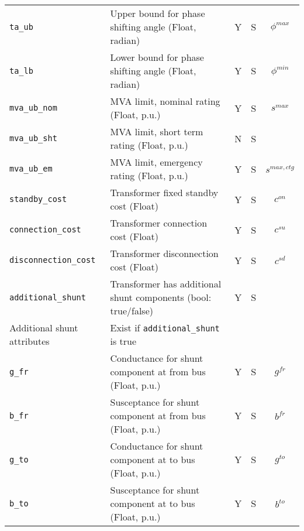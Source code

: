 \documentclass{article}
\begin{document}
\begin{center}
\begin{tabular}{ l | l | c | c | c |}
  {\tt ta\_ub} & Upper bound for phase shifting angle (Float, radian)& Y & S & $\phi^{max}$\\
  {\tt ta\_lb} & Lower bound for phase shifting angle (Float, radian)& Y & S & $\phi^{min}$\\
  {\tt mva\_ub\_nom} & MVA limit, nominal rating (Float, p.u.) & Y & S & $s^{max}$ \\
  {\tt mva\_ub\_sht} & MVA limit, short term rating (Float, p.u.) & N & S &  \\
  {\tt mva\_ub\_em} & MVA limit, emergency rating (Float, p.u.) & Y & S & $s^{max,ctg}$ \\
 
  {\tt standby\_cost} & Transformer fixed standby cost (Float) & Y & S & $c^{on}$\\
  {\tt connection\_cost} &  Transformer connection cost (Float) & Y & S & $c^{su}$\\      
  {\tt disconnection\_cost} & Transformer disconnection cost (Float) & Y & S & $c^{sd}$\\  
  {\tt additional\_shunt} & Transformer has additional shunt components (bool: true/false)& Y & S & \\
  \hline    
  Additional shunt attributes & Exist if {\tt additional\_shunt} is true &  & & \\
  \hline
  {\tt g\_fr} & Conductance for shunt component at from bus (Float, p.u.)& Y & S & $g^{fr}$\\
  {\tt b\_fr} & Susceptance for shunt component at from bus (Float, p.u.)& Y & S & $b^{fr}$\\
  {\tt g\_to} & Conductance for shunt component at to bus (Float, p.u.)& Y & S & $g^{to}$\\
  {\tt b\_to} & Susceptance for shunt component at to bus (Float, p.u.)& Y & S & $b^{to}$\\
  \hline
\end{tabular}
\end{center}
\end{document}

